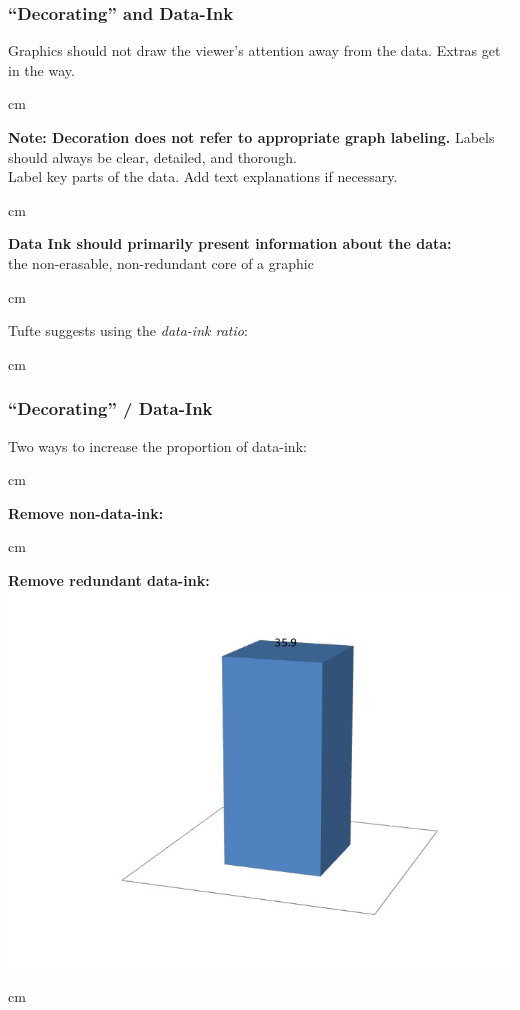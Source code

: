 \documentclass{beamer} %
\begin{document}
\begin{frame}\frametitle{``Decorating'' and Data-Ink}
	\small
	
	Graphics should not draw the viewer's attention away from the data.  Extras get in the way.
	
	 cm
	
	\textbf{Note:  Decoration does not refer to appropriate graph labeling.}  Labels should always be clear, detailed, and thorough.  \\Label key parts of the data.  Add text explanations if necessary.
	
	 cm
	
	\textbf{Data Ink should primarily present information about the data:}  \\the non-erasable, non-redundant core of a graphic
	
	 cm
	
	Tufte suggests using the \emph{data-ink ratio}:
	
	 cm
\end{frame}



\begin{frame}\frametitle{``Decorating'' / Data-Ink}
	\small
	
	Two ways to increase the proportion of data-ink:
	
	 cm
	
	\textbf{Remove non-data-ink:}  
	
	
	 cm
	
	\textbf{Remove redundant data-ink:} \\ 
	\includegraphics[width = 0.6\linewidth]{data-ink.jpg}
	
	 cm
\end{frame}
\end{document}
